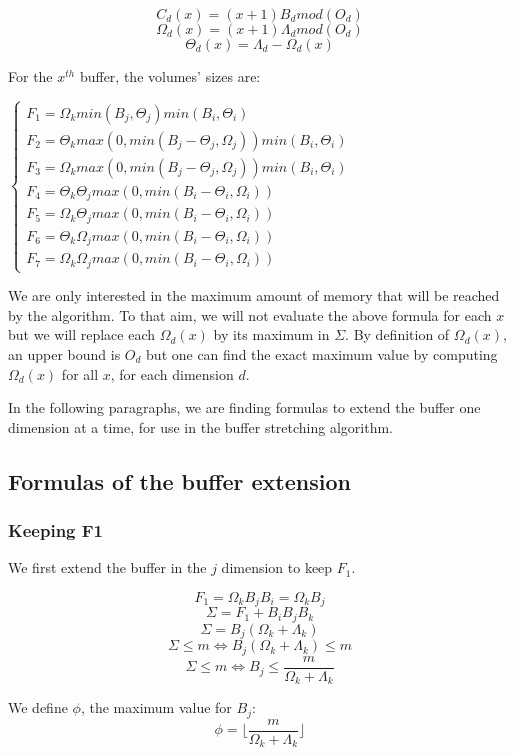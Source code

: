 \documentclass[conference]{IEEEtran}
\begin{document}
$$C_d(x) = (x+1)B_d mod(O_d)$$
$$\Omega_d(x) = (x+1)\Lambda_d mod(O_d)$$
$$\Theta_d(x) = \Lambda_d - \Omega_d(x)$$

For the $x^{th}$ buffer, the volumes' sizes are:

$\begin{cases}
F_1 = \Omega_k min(B_j, \Theta_j) min(B_i, \Theta_i) \\
F_2 = \Theta_k max(0, min(B_j - \Theta_j, \Omega_j)) min(B_i, \Theta_i) \\
F_3 = \Omega_k max(0, min(B_j - \Theta_j, \Omega_j)) min(B_i, \Theta_i) \\
F_4 = \Theta_k \Theta_j max(0, min(B_i-\Theta_i, \Omega_i)) \\
F_5 = \Omega_k \Theta_j max(0, min(B_i-\Theta_i, \Omega_i)) \\
F_6 = \Theta_k \Omega_j max(0, min(B_i-\Theta_i, \Omega_i)) \\
F_7 = \Omega_k \Omega_j max(0, min(B_i-\Theta_i, \Omega_i))
\end{cases}$

We are only interested in the maximum amount of memory that will be reached by
the algorithm. To that aim, we will not evaluate the above formula for each $x$
but we will replace each $\Omega_d(x)$ by its maximum in $\Sigma$. By definition
of $\Omega_d(x)$, an upper bound is $O_d$ but one can find the exact maximum
value by computing $\Omega_d(x)$ for all $x$, for each dimension $d$.

In the following paragraphs, we are finding formulas to extend the buffer one
dimension at a time, for use in the buffer stretching algorithm.

\subsection{Formulas of the buffer extension}
\subsubsection{Keeping F1}

We first extend the buffer in the $j$ dimension to keep $F_1$.

\noindent $$F_1 = \Omega_k B_j B_i = \Omega_k B_j$$
$$\Sigma = F_1 + B_iB_jB_k$$
$$\Sigma = B_j (\Omega_k + \Lambda_k)$$
$$\Sigma \leq m \Leftrightarrow B_j (\Omega_k + \Lambda_k) \leq m$$
$$\Sigma \leq m \Leftrightarrow B_j \leq \frac{m}{\Omega_k + \Lambda_k}$$

We define $\phi$, the maximum value for $B_j$:
$$\phi = \lfloor \frac{m}{\Omega_k + \Lambda_k} \rfloor$$
\end{document}
